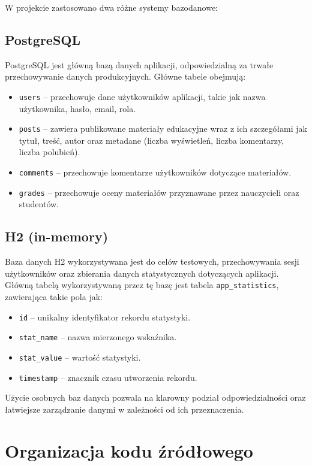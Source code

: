 W projekcie zastosowano dwa różne systemy bazodanowe:

\subsection{PostgreSQL}

PostgreSQL jest główną bazą danych aplikacji, odpowiedzialną za trwałe przechowywanie danych produkcyjnych. Główne tabele obejmują:

\begin{itemize}
    \item \texttt{users} – przechowuje dane użytkowników aplikacji, takie jak nazwa użytkownika, hasło, email, rola.
    \item \texttt{posts} – zawiera publikowane materiały edukacyjne wraz z ich szczegółami jak tytuł, treść, autor oraz metadane (liczba wyświetleń, liczba komentarzy, liczba polubień).
    \item \texttt{comments} – przechowuje komentarze użytkowników dotyczące materiałów.
    \item \texttt{grades} – przechowuje oceny materiałów przyznawane przez nauczycieli oraz studentów.
\end{itemize}

\subsection{H2 (in-memory)}

Baza danych H2 wykorzystywana jest do celów testowych, przechowywania sesji użytkowników oraz zbierania danych statystycznych dotyczących aplikacji. Główną tabelą wykorzystywaną przez tę bazę jest tabela \texttt{app\_statistics}, zawierająca takie pola jak:

\begin{itemize}
    \item \texttt{id} – unikalny identyfikator rekordu statystyki.
    \item \texttt{stat\_name} – nazwa mierzonego wskaźnika.
    \item \texttt{stat\_value} – wartość statystyki.
    \item \texttt{timestamp} – znacznik czasu utworzenia rekordu.
\end{itemize}

Użycie osobnych baz danych pozwala na klarowny podział odpowiedzialności oraz łatwiejsze zarządzanie danymi w zależności od ich przeznaczenia.

\section{Organizacja kodu źródłowego}

